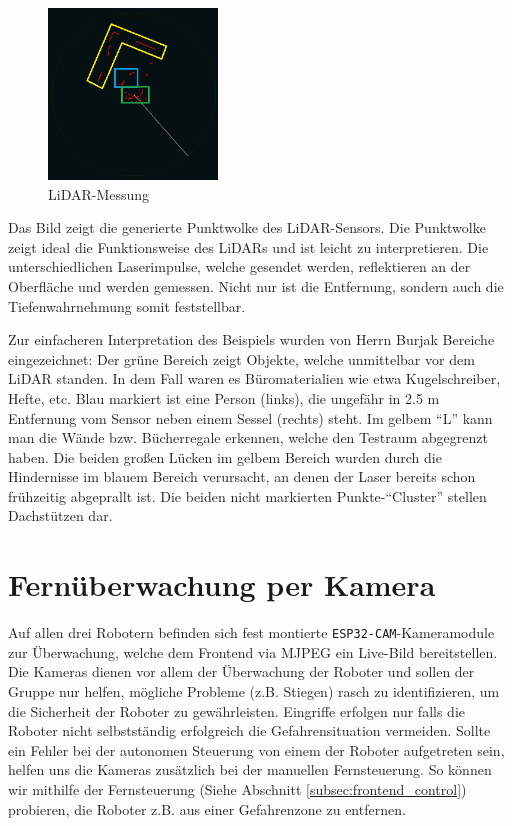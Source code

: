 \begin{figure}[H]
    \includegraphics[width=0.4\textwidth, center]{img/LiDARMessungZeichnung_alt.png}
    \caption{LiDAR-Messung}
    \label{fig:LiDAR-Messung}
\end{figure}

Das Bild zeigt die generierte Punktwolke des LiDAR-Sensors.
%
Die Punktwolke zeigt ideal die Funktionsweise des LiDARs
und ist leicht zu interpretieren.
%
Die unterschiedlichen Laserimpulse,
welche gesendet werden,
reflektieren an der Oberfläche und werden gemessen.
Nicht nur ist die Entfernung, sondern auch die Tiefenwahrnehmung somit feststellbar.

Zur einfacheren Interpretation des Beispiels
wurden von Herrn Burjak Bereiche eingezeichnet:
%
Der grüne Bereich zeigt Objekte,
welche unmittelbar vor dem LiDAR standen.
%
In dem Fall waren es Büromaterialien wie etwa Kugelschreiber, Hefte, etc.
%
Blau markiert ist eine Person (links),
die ungefähr in 2.5 m Entfernung vom Sensor
neben einem Sessel (rechts) steht.
%
Im gelbem ``L'' kann man die Wände bzw. Bücherregale erkennen,
welche den Testraum abgegrenzt haben.
Die beiden großen Lücken im gelbem Bereich wurden
durch die Hindernisse im blauem Bereich verursacht,
an denen der Laser bereits schon frühzeitig abgeprallt ist.
%
Die beiden nicht markierten Punkte-``Cluster'' stellen Dachstützen dar.


\section{Fernüberwachung per Kamera}
\label{subsec:frontend_cam_stream}
Auf allen drei Robotern befinden sich fest montierte
\texttt{ESP32-CAM}-Kameramodule zur Überwachung,
welche dem Frontend via MJPEG ein Live-Bild bereitstellen.
%
Die Kameras dienen vor allem der Überwachung der Roboter und sollen der Gruppe nur helfen,
mögliche Probleme (z.B. Stiegen) rasch zu identifizieren,
um die Sicherheit der Roboter zu gewährleisten.
%
Eingriffe erfolgen nur falls die Roboter nicht selbstständig erfolgreich die Gefahrensituation vermeiden.
%
Sollte ein Fehler bei der autonomen Steuerung von einem der Roboter aufgetreten sein,
helfen uns die Kameras zusätzlich bei der manuellen Fernsteuerung.
%
So können wir mithilfe der Fernsteuerung (Siehe Abschnitt \ref{subsec:frontend_control}) probieren,
die Roboter z.B. aus einer Gefahrenzone zu entfernen.

